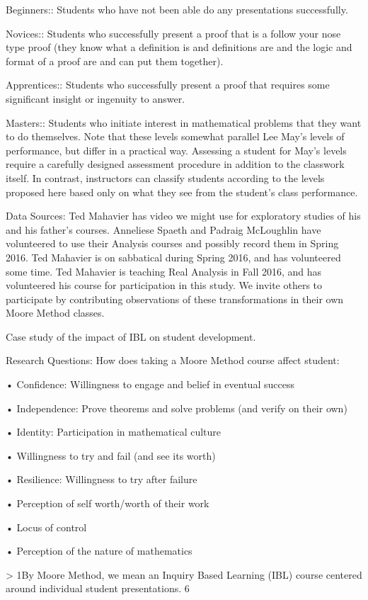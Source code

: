 \documentclass[11pt]{article}
\begin{document}
Beginners:: Students who have not been able do any presentations successfully.

Novices:: Students who successfully present a proof that is a follow your nose type proof (they know what a definition is and definitions are and the logic and format of a proof are and can put them together).

Apprentices:: Students who successfully present a proof that requires some significant insight or ingenuity to answer.

Masters:: Students who initiate interest in mathematical problems that they want to do themselves. Note that these levels somewhat parallel Lee May's levels of performance, but differ in a practical way. Assessing a student for May's levels require a carefully designed assessment procedure in addition to the classwork itself. In contrast, instructors can classify students according to the levels proposed here based only on what they see from the student's class performance.

Data Sources: Ted Mahavier has video we might use for exploratory studies of his and his father's courses. Anneliese Spaeth and Padraig McLoughlin have volunteered to use their Analysis courses and possibly record them in Spring 2016. Ted Mahavier is on sabbatical during Spring 2016, and has volunteered some time. Ted Mahavier is teaching Real Analysis in Fall 2016, and has volunteered his course for participation in this study. We invite others to participate by contributing observations of these transformations in their own Moore Method classes.

Case study of the impact of IBL on student development.

Research Questions: How does taking a Moore Method course affect student:

• Confidence: Willingness to engage and belief in eventual success

• Independence: Prove theorems and solve problems (and verify on their own)

• Identity: Participation in mathematical culture

• Willingness to try and fail (and see its worth)

• Resilience: Willingness to try after failure

• Perception of self worth/worth of their work

• Locus of control

• Perception of the nature of mathematics

> 1By Moore Method, we mean an Inquiry Based Learning (IBL) course centered around individual student presentations. 6
\end{document}
